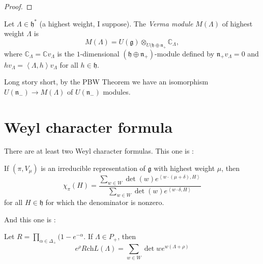\begin{proof}

\end{proof}

\begin{definition}
\label{definition-Verma-module}
\begin{reference}
\cite[Definition 4.1]{jethro-rt}
\end{reference}
Let $\Lambda \in \mathfrak{h}^*$
(a highest weight, I suppose).
The {\it Verma module} $M(\Lambda)$
of highest weight $\Lambda$ is
$$
M(\Lambda)=U(\mathfrak{g})\otimes_{U(\mathfrak{h}\oplus \mathfrak{n}_+}
\mathbb{C}_\Lambda,
$$
where $\mathbb{C}_\Lambda=\mathbb{C}v_\Lambda$
is the $1$-dimensional $(\mathfrak{h} \oplus \mathfrak{n}_+)$-module
defined by $\mathfrak{n}_+v_\Lambda=0$
and $hv_\Lambda=\left<\Lambda,h\right>v_\Lambda$
for all $h \in \mathfrak{h}$.
\end{definition}

Long story short, by the PBW Theorem we
have an isomorphism $U(\mathfrak{n}_-) \to M(\Lambda)$
of $U(\mathfrak{n}_-)$ modules.

\section{Weyl character formula}
\label{section-Weyl-character-formula}

There are at least two Weyl character formulas.
This one is \cite[Theorem 10.14]{Hall}:

\begin{theorem}
\label{theorem-Weyl-character-formula-Hall}
If $(\pi,V_\mu)$ is an irreducible representation of
$\mathfrak{g}$ with highest weight $\mu$, then
\begin{equation}
\label{equation-Weyl-character-formula-Hall}
\chi_\pi(H)=\frac{\sum_{w \in W}\det(w)e^{\left<w\cdot(\mu+\delta),H\right>}}
{\sum_{w \in W}\det(w)e^{\left<w\cdot \delta,H\right>}}
\end{equation}
for all $H \in \mathfrak{h}$ for which the denominator is nonzero.
\end{theorem}

And this one is \cite[Theorem 25.3]{KLAL}:

\begin{theorem}
\label{theorem-Weyl-character-formula-KLAL}
Let $R=\prod_{\alpha \in \Delta_+}(1-e^{-\alpha}$.
If  $\Lambda \in P_+$, then
\begin{equation}
\label{equation-Weyl-character-formula-KLAL}
e^{\rho}R \text{ch}L(\Lambda)=\sum_{w \in W}\det w e^{w(\Lambda+\rho)}
\end{equation}
\end{theorem}

